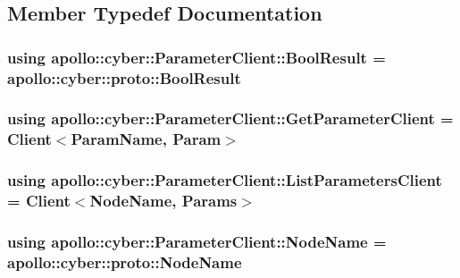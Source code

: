 \subsection{Member Typedef Documentation}
\hypertarget{classapollo_1_1cyber_1_1ParameterClient_a3dd146d628d94d3705dccf625dbca038}{
\subsubsection[{Bool\-Result}]{\setlength{\rightskip}{0pt plus 5cm}using {\bf apollo\-::cyber\-::\-Parameter\-Client\-::\-Bool\-Result} =  apollo\-::cyber\-::proto\-::\-Bool\-Result}}\label{classapollo_1_1cyber_1_1ParameterClient_a3dd146d628d94d3705dccf625dbca038}
\hypertarget{classapollo_1_1cyber_1_1ParameterClient_a8ec0154a2d14d3852069716a4b553c5f}{
\subsubsection[{Get\-Parameter\-Client}]{\setlength{\rightskip}{0pt plus 5cm}using {\bf apollo\-::cyber\-::\-Parameter\-Client\-::\-Get\-Parameter\-Client} =  {\bf Client}$<${\bf Param\-Name}, {\bf Param}$>$}}\label{classapollo_1_1cyber_1_1ParameterClient_a8ec0154a2d14d3852069716a4b553c5f}
\hypertarget{classapollo_1_1cyber_1_1ParameterClient_a5a6fef80c4ea818e6380dd49fe4843e9}{
\subsubsection[{List\-Parameters\-Client}]{\setlength{\rightskip}{0pt plus 5cm}using {\bf apollo\-::cyber\-::\-Parameter\-Client\-::\-List\-Parameters\-Client} =  {\bf Client}$<${\bf Node\-Name}, {\bf Params}$>$}}\label{classapollo_1_1cyber_1_1ParameterClient_a5a6fef80c4ea818e6380dd49fe4843e9}
\hypertarget{classapollo_1_1cyber_1_1ParameterClient_ab50cca8d23f4fc3d41825d39d4d9364c}{
\subsubsection[{Node\-Name}]{\setlength{\rightskip}{0pt plus 5cm}using {\bf apollo\-::cyber\-::\-Parameter\-Client\-::\-Node\-Name} =  apollo\-::cyber\-::proto\-::\-Node\-Name}}\label{classapollo_1_1cyber_1_1ParameterClient_ab50cca8d23f4fc3d41825d39d4d9364c}
